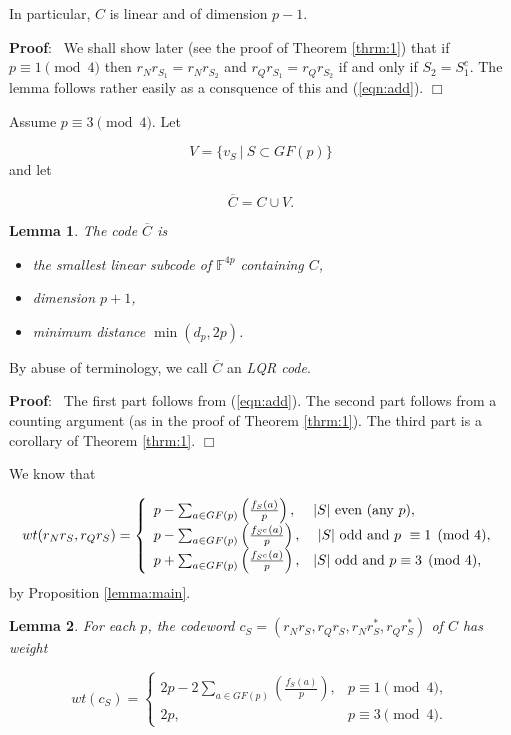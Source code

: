 \documentclass[submission%
]{dmtcs}
\newtheorem{lemma}{Lemma}
\def\fff{{\mathbb{F}}}
\def\pf{{\bf Proof}:\ }
\def\qed{$\Box$}
\begin{document}
In particular, $C$ is linear and of dimension $p-1$.

\pf
We shall show later (see the proof of Theorem \ref{thrm:1})
that if $p\equiv 1\pmod 4$ then
$r_Nr_{S_1}=r_Nr_{S_2}$ and $r_Qr_{S_1}=r_Qr_{S_2}$
if and only if $S_2=S_1^c$. The lemma follows rather easily
as a consquence of this and (\ref{eqn:add}).
\qed

Assume $p\equiv 3\pmod 4$. Let

\[
V = \{v_S\ |\ S\subset GF(p)\}
\]
and let 

\[
\overline{C}=C\cup V.
\]


\begin{lemma}
\label{lemma:p3mod4}
The code $\overline{C}$ is 

\begin{itemize}
\item
the smallest linear subcode of $\fff^{4p}$ containing $C$,
\item
dimension $p+1$,
\item
minimum distance $\min(d_p,2p)$.
\end{itemize}
\end{lemma}

By abuse of terminology, we call $\overline{C}$ an {\it LQR code}.

\pf
The first part follows from (\ref{eqn:add}). The second part follows 
from a counting argument (as in the proof of Theorem \ref{thrm:1}).
The third part is a corollary of Theorem \ref{thrm:1}.
\qed


We know that

\[
wt({r}_N r_S,{r}_Q r_S)
=
\left\{
\begin{array}{ll}
p-\sum_{a\in GF(p)} \left(\frac{f_S (a)}{p}\right),
&|S|\ {\rm even\ (any\ }p {\rm )}, \\
p-\sum_{a\in GF(p)} \left(\frac{f_{S^c} (a)}{p}\right), 
& \ |S|\ {\rm odd\ and\ }p\ \equiv 1\pmod4,\\
p+\sum_{a\in GF(p)} \left(\frac{f_{S^c} (a)}{p}\right),
&|S|\ {\rm odd\ and}\ p\equiv 3\pmod 4,
\end{array}
\right.
\]
by Proposition \ref{lemma:main}. 

\begin{lemma}
\label{lemma:wtLQR}
For each $p$, the codeword
$c_S=\left( {r}_N r_S, {r}_Q r_S, {r}_N r_S^*, {r}_Q r_S^*\right)$
of $C$ has weight

\[
wt(c_S)
=
\left\{
\begin{array}{ll}
2p-2\sum_{a\in GF(p)} \left(\frac{f_S (a)}{p}\right),& p\equiv 1\pmod 4,\\
2p, & p\equiv 3\pmod 4.
\end{array}
\right.
\]
\end{lemma}
\end{document}
